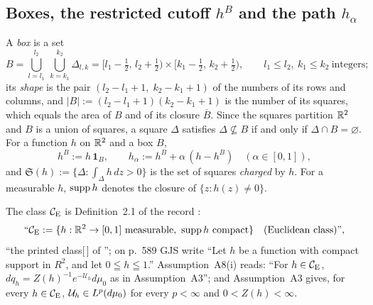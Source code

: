 \subsection{Boxes, the restricted cutoff $h^B$ and the path $h_\alpha$}\label{sec:notation-boxes}

\begin{auxdef}\label{aux:notation-box}
A \emph{box} is a set
\[
 B=\bigcup_{l=l_1}^{l_2}\ \bigcup_{k=k_1}^{k_2}\Delta_{l,k}
 =[l_1-\tfrac12,\,l_2+\tfrac12)\times[k_1-\tfrac12,\,k_2+\tfrac12),
 \qquad l_1\le l_2,\ k_1\le k_2\ \text{integers};
\]
its \emph{shape} is the pair $(l_2-l_1+1,\;k_2-k_1+1)$ of the numbers of its rows and
columns, and $|B|:=(l_2-l_1+1)(k_2-k_1+1)$ is the number of its squares, which equals the
area of $B$ and of its closure $\overline B$.  Since the squares partition $\mathbb{R}^2$ and $B$ is
a union of squares, a square $\Delta$ satisfies $\Delta\not\subseteq B$ if and only if
$\Delta\cap B=\varnothing$.  For a function $h$ on $\mathbb{R}^2$ and a box $B$,
\[
 h^B:=h\,\mathbf 1_B,\qquad h_\alpha:=h^B+\alpha\,(h-h^B)\quad(\alpha\in[0,1]),
\]
and $\mathfrak S(h):=\{\Delta:\int_\Delta h\,dz>0\}$ is the set of squares \emph{charged}
by $h$.  For a measurable $h$, $\operatorname{supp} h$ denotes the closure of $\{z:h(z)\ne0\}$.
\end{auxdef}

The class $\mathcal{C}_{\mathrm E}$ is Definition~2.1 of the record \cite[p.~7]{R}:
\[
 \text{``}\CE:=\{h:\R^2\to[0,1]\ \text{measurable},\ \supp h\ \text{compact}\}
 \quad\text{(Euclidean class)''},
\]
``the printed class[\,] of \cite[p.~589]{GJS}''; on p.~589 GJS write ``Let $h$ be
a function with compact support in $R^2$, and let $0\leqq h\leqq1$.''  Assumption~A8(i)
\cite[p.~10]{R} reads: ``For $h\in\mathcal{C}_{\mathrm E}$, $dq_h=Z(h)^{-1}e^{-\mathcal U_h}d\mu_0$ as in
Assumption~A3''; and Assumption~A3 \cite[p.~8]{R} gives, for every $h\in\mathcal{C}_{\mathrm E}$,
$\mathcal U_h\in L^p(d\mu_0)$ for every $p<\infty$ and $0<Z(h)<\infty$.

